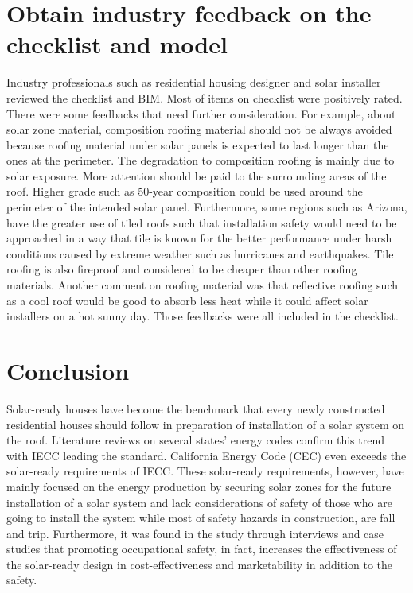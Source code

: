 \documentclass[]{article}
\begin{document}
\hypertarget{obtain-industry-feedback-on-the-checklist-and-model}{%
\section{Obtain industry feedback on the checklist and
model}\label{obtain-industry-feedback-on-the-checklist-and-model}}

Industry professionals such as residential housing designer and solar
installer reviewed the checklist and BIM. Most of items on checklist
were positively rated. There were some feedbacks that need further
consideration. For example, about solar zone material, composition
roofing material should not be always avoided because roofing material
under solar panels is expected to last longer than the ones at the
perimeter. The degradation to composition roofing is mainly due to solar
exposure. More attention should be paid to the surrounding areas of the
roof. Higher grade such as 50-year composition could be used around the
perimeter of the intended solar panel. Furthermore, some regions such as
Arizona, have the greater use of tiled roofs such that installation
safety would need to be approached in a way that tile is known for the
better performance under harsh conditions caused by extreme weather such
as hurricanes and earthquakes. Tile roofing is also fireproof and
considered to be cheaper than other roofing materials. Another comment
on roofing material was that reflective roofing such as a cool roof
would be good to absorb less heat while it could affect solar installers
on a hot sunny day. Those feedbacks were all included in the checklist.

\hypertarget{conclusion}{%
\section{Conclusion}\label{conclusion}}

Solar-ready houses have become the benchmark that every newly
constructed residential houses should follow in preparation of
installation of a solar system on the roof. Literature reviews on
several states' energy codes confirm this trend with IECC leading the
standard. California Energy Code (CEC) even exceeds the solar-ready
requirements of IECC. These solar-ready requirements, however, have
mainly focused on the energy production by securing solar zones for the
future installation of a solar system and lack considerations of safety
of those who are going to install the system while most of safety
hazards in construction, are fall and trip. Furthermore, it was found in
the study through interviews and case studies that promoting
occupational safety, in fact, increases the effectiveness of the
solar-ready design in cost-effectiveness and marketability in addition
to the safety.
\end{document}
